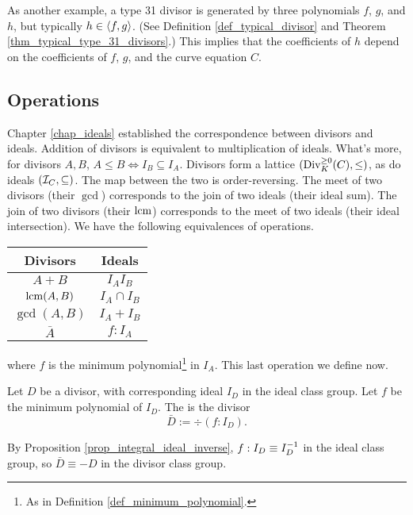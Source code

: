 As another example, a type 31 divisor is generated by three polynomials $f$, $g$, and $h$,
but typically $h \in \pid{f,g}$.
(See Definition \ref{def_typical_divisor} and Theorem \ref{thm_typical_type_31_divisors}.)
This implies that the coefficients of $h$ depend on the coefficients of $f$, $g$, and the curve equation $C$.




\subsection{Operations}

Chapter \ref{chap_ideals} established the correspondence between divisors and ideals.
Addition of divisors is equivalent to multiplication of ideals.
What's more, for divisors $A, B$, $A \leq B \iff I_B \subseteq I_A$.
Divisors form a lattice $(\Div_K^{\geq 0}(C), \leq)$, as do ideals $(\cal I_C, \subseteq)$.
The map between the two is order-reversing.
The meet of two divisors (their $\gcd$) corresponds to the join of two ideals (their ideal sum).
The join of two divisors (their $\lcm$) corresponds to the meet of two ideals (their ideal intersection).
We have the following equivalences of operations.
\begin{center}
  \begin{tabular}{c|c}
    Divisors & Ideals \\
    \hline
    $A + B$ & $I_A I_B$ \\
    $\lcm(A,B)$ & $I_A \cap I_B$ \\
    $\gcd(A,B)$ & $I_A + I_B$ \\
    $\bar A$ & $f : I_A$
  \end{tabular}
\end{center}
where $f$ is the minimum polynomial\footnote{As in Definition \ref{def_minimum_polynomial}.} in $I_A$.
This last operation we define now.
\begin{definition}
  Let $D$ be a divisor, with corresponding ideal $I_D$ in the ideal class group.
  Let $f$ be the minimum polynomial of $I_D$.
  The  is the divisor
  \[ \bar D := \div(f : I_D). \]
\end{definition}
By Proposition \ref{prop_integral_ideal_inverse}, $f : I_D \equiv I_D\inv$ in the ideal class group,
so $\bar D \equiv -D$ in the divisor class group.

